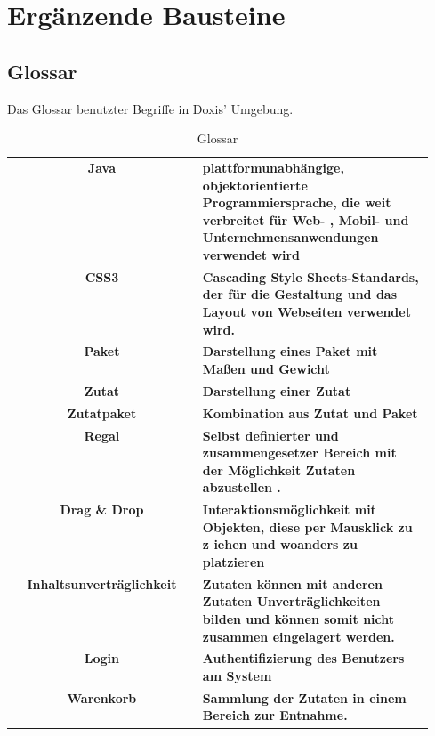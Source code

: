 %
%

\section{Ergänzende Bausteine}

\subsection{Glossar}
Das Glossar benutzter Begriffe in Doxis' Umgebung.

\begin{table}[h]
  \centering
  \begin{tabular}{|c|p{0.55\linewidth}|}
  \hline
    \textbf{Java} & \textbf{plattformunabhängige, objektorientierte Programmiersprache, die weit verbreitet für Web-
    , Mobil- und Unternehmensanwendungen verwendet wird} \\
    \textbf{CSS3} & \textbf{Cascading Style Sheets-Standards, der für die Gestaltung und das Layout von Webseiten verwendet wird.} \\
    \textbf{Paket} & \textbf{Darstellung eines Paket mit Maßen und Gewicht} \\
    \textbf{Zutat} & \textbf{Darstellung einer Zutat} \\
    \textbf{Zutatpaket} & \textbf{Kombination aus Zutat und Paket} \\
    \textbf{Regal} & \textbf{Selbst definierter und zusammengesetzer Bereich mit der Möglichkeit Zutaten abzustellen
  .} \\
    \textbf{Drag \& Drop} & \textbf{Interaktionsmöglichkeit mit Objekten, diese per Mausklick zu z iehen und
  woanders zu platzieren} \\
    \textbf{Inhaltsunverträglichkeit} & \textbf{Zutaten können mit anderen Zutaten Unverträglichkeiten bilden und
  können somit nicht zusammen eingelagert werden.} \\
    \textbf{Login} & \textbf{Authentifizierung des Benutzers am System} \\
    \textbf{Warenkorb} & \textbf{Sammlung der Zutaten in einem Bereich zur Entnahme.} \\

  \hline
  \end{tabular}
  \caption{Glossar}
\end{table}
